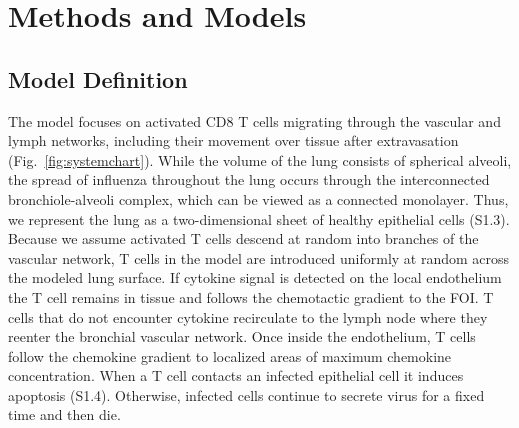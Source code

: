 \documentclass[preprint,10pt,numbers]{elsarticle}
\begin{document}
\section*{Methods and Models}



\subsection*{Model Definition}


The model focuses on activated CD8 T cells migrating through the vascular and lymph networks, including their movement over tissue after extravasation (Fig.~\ref{fig:systemchart}).  While the volume of the lung consists of spherical alveoli, the spread of influenza throughout the lung occurs through the interconnected bronchiole-alveoli complex, which can be viewed as a connected monolayer.  Thus, we represent the lung as a two-dimensional sheet of healthy epithelial cells (S1.3).   Because we assume activated T cells descend at random into branches of the vascular network, T cells in the model are introduced uniformly at random across the modeled lung surface.  If cytokine signal is detected on the local endothelium the T cell remains in tissue and follows the chemotactic gradient to the FOI.  T cells that do not encounter cytokine recirculate to the lymph node where they reenter the bronchial vascular network.  Once inside the endothelium, T cells follow the chemokine gradient to localized areas of maximum chemokine concentration.  When a T cell contacts an infected epithelial cell it induces apoptosis (S1.4).  Otherwise, infected cells continue to secrete virus for a fixed time and then die.
\end{document}
